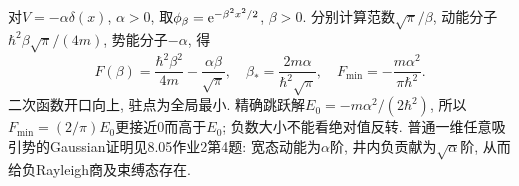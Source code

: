 对$V=-\alpha\delta(x)$, $\alpha>0$, 取$\phi_\beta=\mathrm e^{-\beta^2x^2/2}$, $\beta>0$. 分别计算范数$\sqrt\pi/\beta$, 动能分子$\hbar^2\beta\sqrt\pi/(4m)$, 势能分子$-\alpha$, 得
\[
F(\beta)=\frac{\hbar^2\beta^2}{4m}-\frac{\alpha\beta}{\sqrt\pi},
\quad \beta_*=\frac{2m\alpha}{\hbar^2\sqrt\pi},
\quad F_{\min}=-\frac{m\alpha^2}{\pi\hbar^2}.
\]
二次函数开口向上, 驻点为全局最小. 精确跳跃解$E_0=-m\alpha^2/(2\hbar^2)$, 所以$F_{\min}=(2/\pi)E_0$更接近0而高于$E_0$; 负数大小不能看绝对值反转. 普通一维任意吸引势的Gaussian证明见8.05作业2第4题: 宽态动能为$\alpha$阶, 井内负贡献为$\sqrt\alpha$阶, 从而给负Rayleigh商及束缚态存在.
